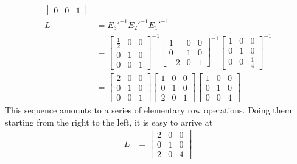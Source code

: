 \begin{exmp}
\begin{align*}
\begin{bmatrix}
0 & 0 & 1 
\end{bmatrix}
\\
L &= E_3'^{-1}E_2'^{-1}E_1'^{-1} \\
&=
\begin{bmatrix}
\frac{1}{2} & 0 & 0 \\
0 & 1 & 0 \\
0 & 0 & 1 
\end{bmatrix}^{-1}
\begin{bmatrix}
1 & 0 & 0 \\
0 & 1 & 0 \\
-2 & 0 & 1 
\end{bmatrix}^{-1}
\begin{bmatrix}
1 & 0 & 0 \\
0 & 1 & 0 \\
0 & 0 & \frac{1}{4} 
\end{bmatrix}
^{-1} \\
&= \begin{bmatrix}
2 & 0 & 0 \\
0 & 1 & 0 \\
0 & 0 & 1 
\end{bmatrix}
\begin{bmatrix}
1 & 0 & 0 \\
0 & 1 & 0 \\
2 & 0 & 1 
\end{bmatrix}
\begin{bmatrix}
1 & 0 & 0 \\
0 & 1 & 0 \\
0 & 0 & 4 
\end{bmatrix}
\end{align*}
This sequence amounts to a series of elementary row operations. Doing them starting from the right to the left, it is easy to arrive at
\begin{align*}
L &=
\begin{bmatrix}
2 & 0 & 0 \\
0 & 1 & 0 \\
2 & 0 & 4
\end{bmatrix}
\end{align*}
\end{exmp}


